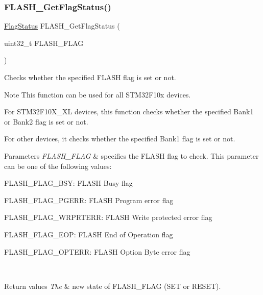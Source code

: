 \subsubsection{\texorpdfstring{F\+L\+A\+S\+H\+\_\+\+Get\+Flag\+Status()}{FLASH\_GetFlagStatus()}}
{\footnotesize\ttfamily \hyperlink{group___exported__types_ga89136caac2e14c55151f527ac02daaff}{Flag\+Status} F\+L\+A\+S\+H\+\_\+\+Get\+Flag\+Status (\begin{DoxyParamCaption}\item[{uint32\+\_\+t}]{F\+L\+A\+S\+H\+\_\+\+F\+L\+AG }\end{DoxyParamCaption})}



Checks whether the specified F\+L\+A\+SH flag is set or not. 

\begin{DoxyNote}{Note}
This function can be used for all S\+T\+M32\+F10x devices.
\begin{DoxyItemize}
\item For S\+T\+M32\+F10\+X\+\_\+\+XL devices, this function checks whether the specified Bank1 or Bank2 flag is set or not.
\item For other devices, it checks whether the specified Bank1 flag is set or not. 
\end{DoxyItemize}
\end{DoxyNote}

\begin{DoxyParams}{Parameters}
{\em F\+L\+A\+S\+H\+\_\+\+F\+L\+AG} & specifies the F\+L\+A\+SH flag to check. This parameter can be one of the following values\+: \begin{DoxyItemize}
\item F\+L\+A\+S\+H\+\_\+\+F\+L\+A\+G\+\_\+\+B\+SY\+: F\+L\+A\+SH Busy flag \item F\+L\+A\+S\+H\+\_\+\+F\+L\+A\+G\+\_\+\+P\+G\+E\+RR\+: F\+L\+A\+SH Program error flag \item F\+L\+A\+S\+H\+\_\+\+F\+L\+A\+G\+\_\+\+W\+R\+P\+R\+T\+E\+RR\+: F\+L\+A\+SH Write protected error flag \item F\+L\+A\+S\+H\+\_\+\+F\+L\+A\+G\+\_\+\+E\+OP\+: F\+L\+A\+SH End of Operation flag \item F\+L\+A\+S\+H\+\_\+\+F\+L\+A\+G\+\_\+\+O\+P\+T\+E\+RR\+: F\+L\+A\+SH Option Byte error flag \end{DoxyItemize}
\\
\hline
\end{DoxyParams}

\begin{DoxyRetVals}{Return values}
{\em The} & new state of F\+L\+A\+S\+H\+\_\+\+F\+L\+AG (S\+ET or R\+E\+S\+ET). \\
\hline
\end{DoxyRetVals}


